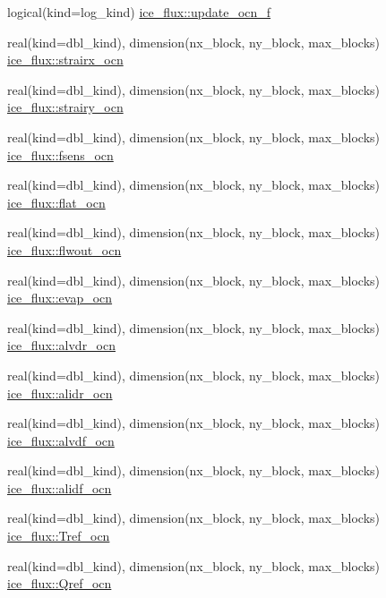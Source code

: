 \begin{DoxyCompactItemize}
\item 
logical(kind=log\_\-kind) \hyperlink{namespaceice__flux_ac97b083c2136cd4e0deb365a3a3f4f6b}{ice\_\-flux::update\_\-ocn\_\-f}
\item 
real(kind=dbl\_\-kind), dimension(nx\_\-block, ny\_\-block, max\_\-blocks) \hyperlink{namespaceice__flux_a95351534eb982b4f0afc45ae4455c392}{ice\_\-flux::strairx\_\-ocn}
\item 
real(kind=dbl\_\-kind), dimension(nx\_\-block, ny\_\-block, max\_\-blocks) \hyperlink{namespaceice__flux_a4e7200c0bea830cf623a6cdf2218cf1c}{ice\_\-flux::strairy\_\-ocn}
\item 
real(kind=dbl\_\-kind), dimension(nx\_\-block, ny\_\-block, max\_\-blocks) \hyperlink{namespaceice__flux_aa2a8953e1c37a1f09551ac626a62263b}{ice\_\-flux::fsens\_\-ocn}
\item 
real(kind=dbl\_\-kind), dimension(nx\_\-block, ny\_\-block, max\_\-blocks) \hyperlink{namespaceice__flux_aa7641984ea4c796e511a25d93fd3b86f}{ice\_\-flux::flat\_\-ocn}
\item 
real(kind=dbl\_\-kind), dimension(nx\_\-block, ny\_\-block, max\_\-blocks) \hyperlink{namespaceice__flux_a0242ff7a5b643169198472b59e49cfa7}{ice\_\-flux::flwout\_\-ocn}
\item 
real(kind=dbl\_\-kind), dimension(nx\_\-block, ny\_\-block, max\_\-blocks) \hyperlink{namespaceice__flux_adea597318ddb4be7d507f86cc3b48f05}{ice\_\-flux::evap\_\-ocn}
\item 
real(kind=dbl\_\-kind), dimension(nx\_\-block, ny\_\-block, max\_\-blocks) \hyperlink{namespaceice__flux_a0d5c384f44be34217703bef2e23ebdc6}{ice\_\-flux::alvdr\_\-ocn}
\item 
real(kind=dbl\_\-kind), dimension(nx\_\-block, ny\_\-block, max\_\-blocks) \hyperlink{namespaceice__flux_a28770e51f25a00f4a215c889264041b8}{ice\_\-flux::alidr\_\-ocn}
\item 
real(kind=dbl\_\-kind), dimension(nx\_\-block, ny\_\-block, max\_\-blocks) \hyperlink{namespaceice__flux_a3060ba0c930f8b0676cfc2a6af612769}{ice\_\-flux::alvdf\_\-ocn}
\item 
real(kind=dbl\_\-kind), dimension(nx\_\-block, ny\_\-block, max\_\-blocks) \hyperlink{namespaceice__flux_a9d1893a1b54339b70d7119c4c03163c8}{ice\_\-flux::alidf\_\-ocn}
\item 
real(kind=dbl\_\-kind), dimension(nx\_\-block, ny\_\-block, max\_\-blocks) \hyperlink{namespaceice__flux_af9f2e55cc441e661ab391bd3c4640ce4}{ice\_\-flux::Tref\_\-ocn}
\item 
real(kind=dbl\_\-kind), dimension(nx\_\-block, ny\_\-block, max\_\-blocks) \hyperlink{namespaceice__flux_afece1d3107dcbd97234912ff91e89d8b}{ice\_\-flux::Qref\_\-ocn}

\end{DoxyCompactItemize}
